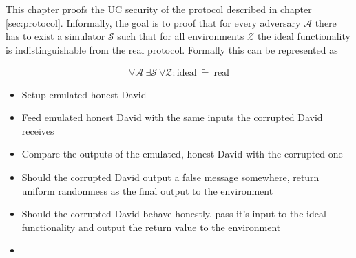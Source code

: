 \label{sec:security}

This chapter proofs the UC \cite{canetti05} security of the protocol described
in chapter \ref{sec:protocol}. Informally, the goal is to proof that for every
adversary $\mathcal{A}$ there has to exist a simulator $\mathcal{S}$ such that
for all environments $\mathcal{Z}$ the ideal functionality is indistinguishable
from the real protocol. Formally this can be represented as

\begin{align*}
%
\forall \mathcal{A}\ \exists \mathcal{S}\ \forall \mathcal{Z} :
\text{ideal}\ \widetilde{=}\ \text{real}
%
\end{align*}

%
%
\label{sec:simulators}


\label{sec:simulator-david}

\begin{itemize}

  \item Setup emulated honest David

  \item Feed emulated honest David with the same inputs the corrupted David
    receives

  \item Compare the outputs of the emulated, honest David with the corrupted one

  \item Should the corrupted David output a false message somewhere, return
    uniform randomness as the final output to the environment

  \item Should the corrupted David behave honestly, pass it's input to the ideal
    functionality and output the return value to the environment

\end{itemize}



\begin{itemize}

  \item

\end{itemize}


%
%
\label{sec:proof}


